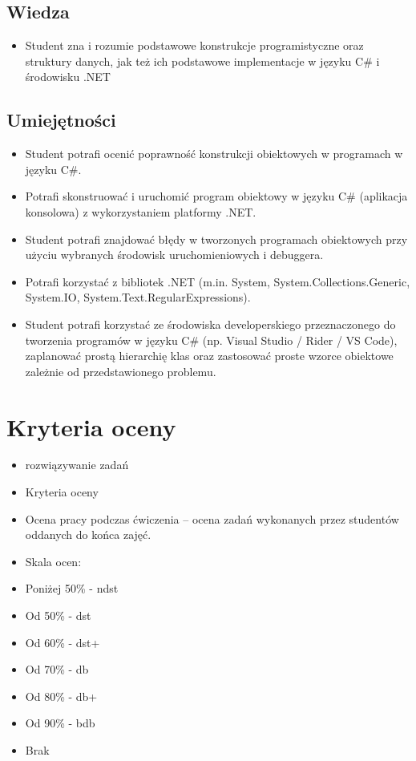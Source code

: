 \documentclass[12pt, a4paper]{article}
\begin{document}
\subsection*{Wiedza}
\begin{itemize}
  \item Student zna i rozumie podstawowe konstrukcje programistyczne oraz struktury danych, jak też ich podstawowe implementacje w języku C\# i środowisku .NET
\end{itemize}

\subsection*{Umiejętności}
\begin{itemize}
  \item Student potrafi ocenić poprawność konstrukcji obiektowych w programach w języku C\#.
  \item Potrafi skonstruować i uruchomić program obiektowy w języku C\# (aplikacja konsolowa) z wykorzystaniem platformy .NET.
  \item Student potrafi znajdować błędy w tworzonych programach obiektowych przy użyciu wybranych środowisk uruchomieniowych i debuggera.
  \item Potrafi korzystać z bibliotek .NET (m.in. System, System.Collections.Generic, System.IO, System.Text.RegularExpressions).
  \item Student potrafi korzystać ze środowiska developerskiego przeznaczonego do tworzenia programów w języku C\# (np. Visual Studio / Rider / VS Code), zaplanować prostą hierarchię klas oraz zastosować proste wzorce obiektowe zależnie od przedstawionego problemu.
\end{itemize}

\section{Kryteria oceny}

\begin{itemize}
  \item rozwiązywanie zadań
  \item Kryteria oceny
  \item Ocena pracy podczas ćwiczenia – ocena zadań wykonanych przez studentów oddanych do końca zajęć.
  \item Skala ocen:
  \item Poniżej 50\% - ndst
  \item Od 50\% - dst
  \item Od 60\% - dst+
  \item Od 70\% - db
  \item Od 80\% - db+
  \item Od 90\% - bdb
  \item Brak
\end{itemize}
\end{document}
